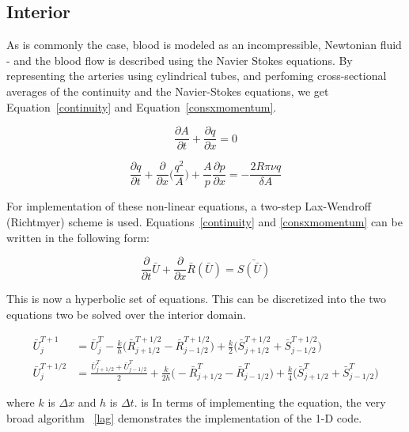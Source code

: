 \documentclass[12pt]{article}
\newcommand{\partder}[2]{\frac{\partial #1}{\partial #2}}
\newcommand{\tensor}[1]{\bar{#1}}
\newcommand{\tensplus}[3]{\tensor{#1}_{#2}^{#3}}
\begin{document}
\subsection{Interior}
As is commonly the case, blood is modeled as an incompressible, Newtonian fluid - and the blood flow is described using the Navier Stokes equations. By representing the arteries using cylindrical tubes, and perfoming cross-sectional averages of the continuity and the Navier-Stokes equations, we get Equation~\eqref{continuity} and Equation~\eqref{consxmomentum}.

\begin{equation}
	\label{continuity}
	\partder{A}{t} + \partder{q}{x} = 0
\end{equation}

\begin{equation}
	\label{consxmomentum}
	\partder{q}{t} + \partder{}{x}\Bigg(\frac{q^2}{A}\Bigg) + \frac{A}{p}\partder{p}{x} = -\frac{2R\pi \nu q}{\delta A}
\end{equation}

For implementation of these non-linear equations, a two-step Lax-Wendroff (Richtmyer) scheme is used. Equations~\ref{continuity} and \ref{consxmomentum} can be written in the following form:

\begin{equation} 
	\label{discrete1}
	\partder{}{t} \tensor{U} + \partder{}{x} \tensor{R}(\tensor{U}) = \tensor{S(\tensor{U})}
\end{equation}

This is now a hyperbolic set of equations. This can be discretized into the two equations two be solved over the interior domain. 

\begin{align}
		\tensplus{U}{j}{T+1} &= \tensplus{U}{j}{T} - \frac{k}{h} \Bigg(\tensplus{R}{j+1/2}{T+1/2} - \tensplus{R}{j-1/2}{T+1/2} \Bigg) + \frac{k}{2} \Bigg(\tensplus{S}{j		+1/2}{T+1/2} + \tensplus{S}{j-1/2}{T+1/2} \Bigg)   \label{bigu1}\\	
		\tensplus{U}{j}{T+1/2} &= \frac{\tensplus{U}{j+1/2}{T} + \tensplus{U}{j-1/2}{T}}{2} + \frac{k}{2h} \Bigg(-\tensplus{R}{j+1/2}{T} - \tensplus{R}{j-1/2}{T} \Bigg)  		+ \frac{k}{4} \Bigg(\tensplus{S}{j+1/2}{T} + \tensplus{S}{j-1/2}{T} \Bigg)
		\label{bigu2}
\end{align}

where $k$ is $\Delta x$ and $h$ is $\Delta t$. is In terms of implementing the equation, the very broad algorithm ~\ref{lag} demonstrates the implementation of the 1-D code. 
\end{document}
